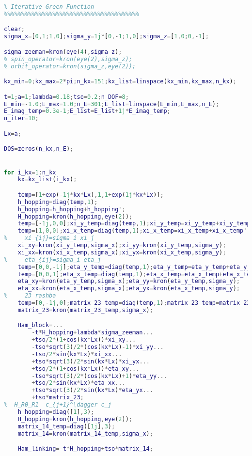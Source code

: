 \begin{lstlisting}[language=matlab]
%%%%%%%%%%%%%%%%%%%%%%%%%%%%%%%%%%%%%%%
% Iterative Green Function
%%%%%%%%%%%%%%%%%%%%%%%%%%%%%%%%%%%%%%%

clear;
sigma_x=[0,1;1,0];sigma_y=1j*[0,-1;1,0];sigma_z=[1,0;0,-1];

sigma_zeeman=kron(eye(4),sigma_z);
% spin_operator=kron(eye(2),sigma_z);
% orbit_operator=kron(sigma_z,eye(2));

kx_min=0;kx_max=2*pi;n_kx=151;kx_list=linspace(kx_min,kx_max,n_kx);

t=1;a=1;lambda=0.18;tso=0.2;n_DOF=8;
E_min=-1.0;E_max=1.0;n_E=301;E_list=linspace(E_min,E_max,n_E);
E_imag_temp=0.3e-1;E_list=E_list+1j*E_imag_temp;
n_iter=10;

Lx=a;

DOS=zeros(n_kx,n_E);


for i_kx=1:n_kx
    kx=kx_list(i_kx);

    temp=[1+exp(-1j*kx*Lx),1,1+exp(1j*kx*Lx)];
    h_hopping=diag(temp,1);
    h_hopping=h_hopping+h_hopping';
    H_hopping=kron(h_hopping,eye(2));
    temp=[-1j,0,0];xi_y_temp=diag(temp,1);xi_y_temp=xi_y_temp+xi_y_temp';
    temp=[1,0,0];xi_x_temp=diag(temp,1);xi_x_temp=xi_x_temp+xi_x_temp';
%     xi_{ij}=sigma_i xi_j
    xi_xy=kron(xi_y_temp,sigma_x);xi_yy=kron(xi_y_temp,sigma_y);
    xi_xx=kron(xi_x_temp,sigma_x);xi_yx=kron(xi_x_temp,sigma_y);
%     eta_{ij}=sigma_i eta_j
    temp=[0,0,-1j];eta_y_temp=diag(temp,1);eta_y_temp=eta_y_temp+eta_y_temp';
    temp=[0,0,1];eta_x_temp=diag(temp,1);eta_x_temp=eta_x_temp+eta_x_temp';
    eta_xy=kron(eta_y_temp,sigma_x);eta_yy=kron(eta_y_temp,sigma_y);
    eta_xx=kron(eta_x_temp,sigma_x);eta_yx=kron(eta_x_temp,sigma_y);
%     23 rashba
    temp=[0,-1j,0];matrix_23_temp=diag(temp,1);matrix_23_temp=matrix_23_temp+matrix_23_temp';
    matrix_23=kron(matrix_23_temp,sigma_x);

    Ham_block=...
        -t*H_hopping+lambda*sigma_zeeman...
        +tso/2*(1+cos(kx*Lx))*xi_xy...
        -tso*sqrt(3)/2*(cos(kx*Lx)-1)*xi_yy...
        -tso/2*sin(kx*Lx)*xi_xx...
        +tso*sqrt(3)/2*sin(kx*Lx)*xi_yx...
        +tso/2*(1+cos(kx*Lx))*eta_xy...
        -tso*sqrt(3)/2*(cos(kx*Lx)+1)*eta_yy...
        +tso/2*sin(kx*Lx)*eta_xx...
        +tso*sqrt(3)/2*sin(kx*Lx)*eta_yx...
        +tso*matrix_23;
%  H_R0_R1  c_{j+1}^\dagger c_j
    h_hopping=diag([1],3);
    H_hopping=kron(h_hopping,eye(2));
    matrix_14_temp=diag([1j],3);
    matrix_14=kron(matrix_14_temp,sigma_x);

    Ham_linking=-t*H_hopping+tso*matrix_14;


\end{lstlisting}
